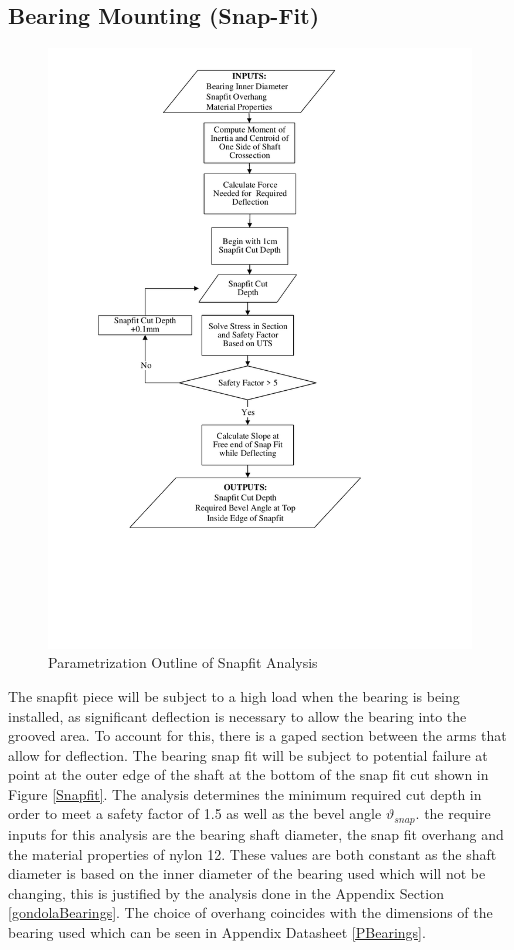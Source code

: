 \documentclass[../main.tex]{subfiles}
\begin{document}
\subsection{Bearing Mounting (Snap-Fit)} \label{snapFit}
\begin{figure}[H]
	\centering
	\includegraphics[width=0.82 \textwidth]{img/Paramaterization/snapFit.pdf}
	\caption{Parametrization Outline of Snapfit Analysis}
	\label{fig:snapParamaterization}
\end{figure}

The snapfit piece will be subject to a high load when the bearing is being installed, as significant deflection is necessary to allow the bearing into the grooved area. To account for this, there is a gaped section between the arms that allow for deflection. The bearing snap fit will be subject to potential failure at point at the outer edge of the shaft at the bottom of the snap fit cut shown in Figure \ref{Snapfit}. The analysis determines the minimum required cut depth in order to meet a safety factor of 1.5 as well as the bevel angle $\vartheta_{snap}$. the require inputs for this analysis are the bearing shaft diameter, the snap fit overhang and the material properties of nylon 12. These values are both constant as the shaft diameter is based on the inner diameter of the bearing used which will not be changing, this is justified by the analysis done in the Appendix Section \ref{gondolaBearings}. The choice of overhang coincides with the dimensions of the bearing used which can be seen in Appendix Datasheet \ref{PBearings}.
\end{document}
